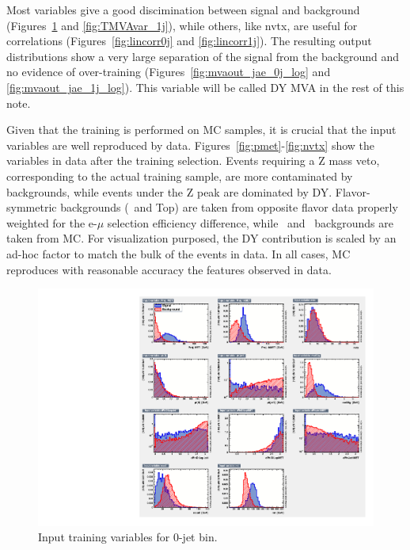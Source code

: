 Most variables give a good discimination between signal and background (Figures~\ref{fig:TMVAvar_0j} and \ref{fig:TMVAvar_1j}), while others, like nvtx, 
are useful for correlations (Figures~\ref{fig:lincorr0j} and \ref{fig:lincorr1j}).
The resulting output distributions show a very large separation of the signal from the background and no evidence of 
over-training (Figures~\ref{fig:mvaout_jae_0j_log} and \ref{fig:mvaout_jae_1j_log}).
This variable will be called DY MVA in the rest of this note.

Given that the training is performed on MC samples, it is crucial that the input variables are well reproduced by data.
Figures~\ref{fig:pmet}-\ref{fig:nvtx} show the variables in data after the training selection.
Events requiring a Z mass veto, corresponding to the actual training sample, are more contaminated by backgrounds, while events under the Z peak are dominated by DY.
Flavor-symmetric backgrounds (\W\W\ and Top) are taken from opposite flavor data properly weighted for the e-$\mu$ selection efficiency difference, while \W\Z\ 
and \Z\Z\ backgrounds are taken from MC. For visualization purposed, the DY contribution is scaled by an ad-hoc factor to match the bulk of the events in data.
In all cases, MC reproduces with reasonable accuracy the features observed in data.

\begin{figure}[!hbtp]
\begin{center}
\includegraphics[width=.9\textwidth]{figures/TMVAvar_0j.pdf}
\caption{Input training variables for 0-jet bin.}
\label{fig:TMVAvar_0j}
\end{center}
\end{figure}

